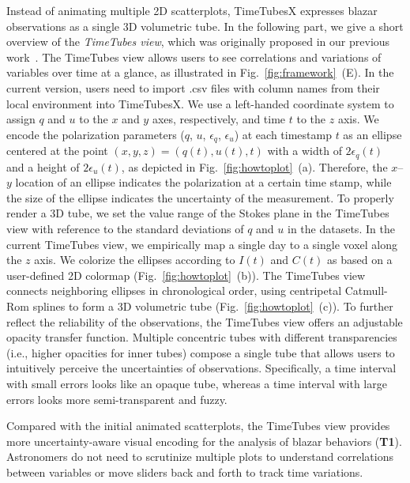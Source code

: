 Instead of animating multiple 2D scatterplots,
TimeTubesX expresses blazar observations as a single 3D volumetric tube. 
In the following part, we give a short overview of the \emph{TimeTubes view}, which was originally proposed in our previous work~\cite{Fujishiro2018}.
The TimeTubes view %
allows users to see correlations and variations of variables over time at a glance, as illustrated in Fig.~\ref{fig:framework}~(E).
In the current version, users need to import .csv files with column names from their local environment into TimeTubesX.
%
We use a left-handed coordinate system to assign $q$ and $u$ to the $x$ and $y$ axes, respectively, and time $t$ to the $z$ axis.
We encode the polarization parameters ($q$, $u$, $\epsilon_q$, $\epsilon_u$) at each timestamp $t$ as an ellipse centered at the point $(x, y, z) = (q(t), u(t), t)$ with a width of $2\epsilon_q(t)$ and a height of $2\epsilon_u(t)$, as depicted in Fig.~\ref{fig:howtoplot}~(a). 
Therefore, the $x$--$y$ location of an ellipse indicates the polarization at a certain time stamp, while the size of the ellipse indicates the uncertainty of the measurement.
To properly render a 3D tube, we set the value range of the Stokes plane in the TimeTubes view with reference to the standard deviations of $q$ and $u$ in the datasets. 
In the current TimeTubes view, we empirically map a single day to a single voxel along the $z$ axis.
%
We colorize the ellipses according to $I(t)$ and $C(t)$ as based on a user-defined 2D colormap (Fig.~\ref{fig:howtoplot}~(b)). 
The TimeTubes view connects neighboring ellipses in chronological order, using centripetal Catmull-Rom splines to form a 3D volumetric tube (Fig.~\ref{fig:howtoplot}~(c)). 
To further reflect the reliability of the observations, the TimeTubes view offers an adjustable opacity transfer function.
Multiple concentric tubes with different transparencies (i.e., higher opacities for inner tubes) compose a single tube that allows users to intuitively perceive the uncertainties of observations.
Specifically, a time interval with small errors looks like an opaque tube, whereas a time interval with large errors looks more semi-transparent and fuzzy.

Compared with the initial animated scatterplots,
the TimeTubes view provides more uncertainty-aware visual encoding for the analysis of blazar behaviors (\textbf{T1}).
Astronomers do not need to scrutinize multiple plots to understand correlations between variables
or move sliders back and forth %
to track time variations.

